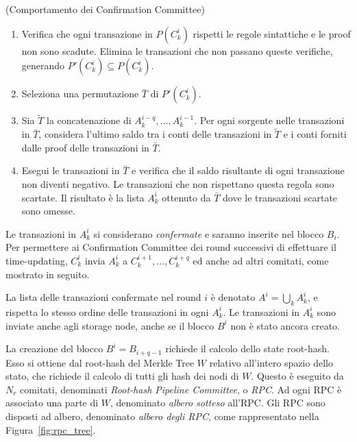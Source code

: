 \begin{algo}{(Comportamento dei Confirmation Committee)}\label{alg:cc}
\begin{enumerate}
	\item Verifica che ogni transazione in $P(C_k^i)$ rispetti le regole sintattiche e le proof non sono scadute. Elimina le transazioni che non passano queste verifiche, generando $P'(C_k^i) \subseteq P(C_k^i)$.
	\item Seleziona una permutazione $\bar{T}$ di $P'(C_k^i)$.
	\item Sia $\tilde{T}$ la concatenazione di $A_k^{i-q}, \dots, A_k^{i-1}$. Per ogni sorgente nelle transazioni in $\bar{T}$, considera l'ultimo saldo tra i conti delle transazioni in $\tilde{T}$ e i conti forniti dalle proof delle transazioni in $\bar{T}$.
	\item Esegui le transazioni in $\bar{T}$ e verifica che il saldo risultante di ogni transazione non diventi negativo. Le transazioni che non rispettano questa regola sono scartate. Il risultato è la lista $A_k^i$ ottenuto da $\bar{T}$ dove le transazioni scartate sono omesse.	
\end{enumerate}
\end{algo}

Le transazioni in $A_k^i$ si considerano \emph{confermate} e saranno inserite nel blocco $B_i$. Per permettere ai Confirmation Committee dei round successivi di effettuare il time-updating, $C_k^i$ invia $A_k^i$ a $C_k^{i+1}, \dots, C_k^{i+q}$ ed anche ad altri comitati, come mostrato in seguito.

La lista delle transazioni confermate nel round $i$ è denotato $A^i = \bigcup_k A_k^i$, e rispetta lo stesso ordine delle transazioni in ogni $A_k^i$. Le transazioni in $A_k^i$ sono inviate anche agli storage node, anche se il blocco $B^i$ non è stato ancora creato.

La creazione del blocco $B^i = B_{i+q-1}$ richiede il calcolo dello state root-hash. Esso si ottiene dal root-hash del Merkle Tree $W$ relativo all'intero spazio dello stato, che richiede il calcolo di tutti gli hash dei nodi di $W$.
Questo è eseguito da $N_r$ comitati, denominati \emph{Root-hash Pipeline Committee}, o \emph{RPC}. Ad ogni RPC è associato una parte di $W$, denominato \emph{albero sotteso} all'RPC. Gli RPC sono disposti ad albero, denominato \emph{albero degli RPC}, come rappresentato nella Figura~\ref{fig:rpc_tree}.

